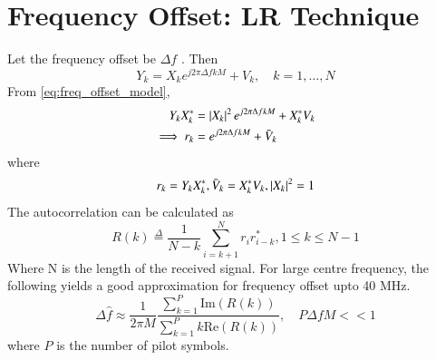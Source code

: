 \documentclass[journal,12pt,twocolumn]{IEEEtran}
\begin{document}
\section{Frequency Offset: LR Technique}
Let the frequency offset be 
$\Delta f$  
\cite{freq_offset}
.  Then
\begin{equation}
\label{eq:freq_offset_model}
Y_k= X_k e^{j2\pi\Delta fkM} + V_k, \quad k = 1,\dots,N 
\end{equation}  
From \eqref{eq:freq_offset_model},
%
\begin{align}
Y_kX_k^*&= \left\vert X_k\right\vert^2e^{j2\pi\Delta fkM}+ X_k^*{V}_k\\
\implies r_k&=e^{j2\pi\Delta fkM}+ \bar{V}_k
\end{align}
where
\begin{align}
r_k=Y_kX_k^*, \bar{V}_k=X_k^*{V}_k, \left\vert X_k\right\vert^2=1
\end{align}
%
The autocorrelation can be calculated as
\begin{equation}
R(k) \overset{\Delta}{=} \frac{1}{N-k}\sum_{i=k+1}^{N} r_{i}r^{*}_{i-k}
 , 1 \leq k \leq N-1
\end{equation}
Where N is the length of the received signal.
For large centre frequency, the following yields a good approximation for frequency offset upto 40 
MHz.
\begin{equation}
\Delta\hat{f} \approx \frac{1}{2\pi M}\frac{\sum_{k=1}^{P}\text{Im}(R(k))}{\sum_{k=1}^{P}k\text{Re}(R(k))},
\quad  P\Delta{f}M << 1
\label{eq:Z}
\end{equation}
%
where $P$ is the number of pilot symbols.
\end{document}
